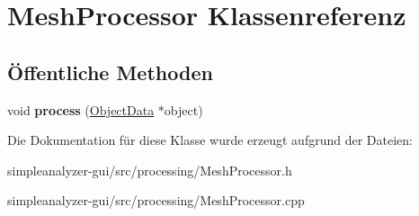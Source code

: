 \hypertarget{classMeshProcessor}{\section{Mesh\-Processor Klassenreferenz}
\label{classMeshProcessor}
}
\subsection*{Öffentliche Methoden}
\begin{DoxyCompactItemize}
\item 
\hypertarget{classMeshProcessor_a060c3815db33f8e52ac620ed2239ccc9}{void {\bfseries process} (\hyperlink{classObjectData}{Object\-Data} $\ast$object)}\label{classMeshProcessor_a060c3815db33f8e52ac620ed2239ccc9}

\end{DoxyCompactItemize}


Die Dokumentation für diese Klasse wurde erzeugt aufgrund der Dateien\-:\begin{DoxyCompactItemize}
\item 
simpleanalyzer-\/gui/src/processing/Mesh\-Processor.\-h\item 
simpleanalyzer-\/gui/src/processing/Mesh\-Processor.\-cpp\end{DoxyCompactItemize}
